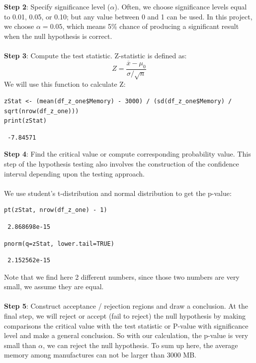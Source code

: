 \documentclass[a4paper]{article}
\begin{document}
\textbf{Step 2}: Specify significance level ($\alpha$). Often, we choose significance levels equal to 0.01, 0.05, or 0.10; but any value between 0 and 1 can be used. In this project, we choose $\alpha = 0.05$, which means 5\% chance of producing a significant result when the null hypothesis is correct.\\\\
\textbf{Step 3}:  Compute the test statistic. Z-statistic is defined as:
$$Z = \dfrac{\overline{x}-\mu_0}{\sigma / \sqrt{n}}$$
We will use this function to calculate Z:
\begin{mdframed}[leftline=false,rightline=false,backgroundcolor=lightblue!10,nobreak=false]
\begin{verbatim}
zStat <- (mean(df_z_one$Memory) - 3000) / (sd(df_z_one$Memory) / sqrt(nrow(df_z_one)))
print(zStat)      
\end{verbatim}
\end{mdframed}
\begin{lstlisting}
 -7.84571
\end{lstlisting}
\textbf{Step 4}: Find the critical value or compute corresponding probability value. This step of the hypothesis testing also involves the construction of the confidence interval depending upon the testing approach.\\\\
We use student's t-distribution and normal distribution to get the p-value:
\begin{mdframed}[leftline=false,rightline=false,backgroundcolor=lightblue!10,nobreak=false]
\begin{verbatim}
pt(zStat, nrow(df_z_one) - 1)    
\end{verbatim}
\end{mdframed}
\begin{lstlisting}
 2.868698e-15
\end{lstlisting}
\begin{mdframed}[leftline=false,rightline=false,backgroundcolor=lightblue!10,nobreak=false]
\begin{verbatim}
pnorm(q=zStat, lower.tail=TRUE)
\end{verbatim}
\end{mdframed}
\begin{lstlisting}
 2.152562e-15
\end{lstlisting}
Note that we find here 2 different numbers, since those two numbers are very small, we assume they are equal.\\\\
\textbf{Step 5}: Construct acceptance / rejection regions and draw a conclusion. At the final step, we will reject or accept (fail to reject) the null hypothesis by making comparisons the critical value with the test statistic or P-value with significance level and make a general conclusion. So with our calculation, the p-value is very small than $\alpha$, we can reject the null hypothesis. To sum up here, the average memory among manufactures can not be larger than 3000 MB. 
\end{document}

